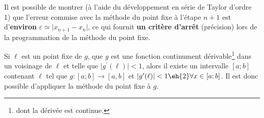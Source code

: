 %
%
%
%
%

\bigskip
\begin{remarques}\label{rem:critère_pt_fixe}
\item Il est possible de montrer (à l'aide du développement en série de Taylor d'ordre 1) que l'erreur commise avec la méthode du point fixe à l'étape $n+1$ est d'\textbf{environ} $\varepsilon \simeq\vert x_{n+1}-x_n \vert$, ce qui fournit \textbf{un critère d'arrêt} (précision) lors de la programmation de la méthode du point fixe.

\item\label{rem:critère_pt_fixe_ii} Si $\ell$ est un point fixe de $g$, que $g$ est une fonction continument  dérivable\footnote{dont la dérivée est continue.} dans un voisinage de $\ell$ et telle que $\vert g^\prime(\ell)\vert <1$, alors il existe un intervalle $[a;b]$ contenant $\ell$ tel que $g:[a;b]\rightarrow[a,b]$ et $\vert g^\prime(\ell)\vert <1 \eh{2}\forall x\in [a;b]$. Il est donc possible d'appliquer la méthode du point fixe à $g$.
\end{remarques}


